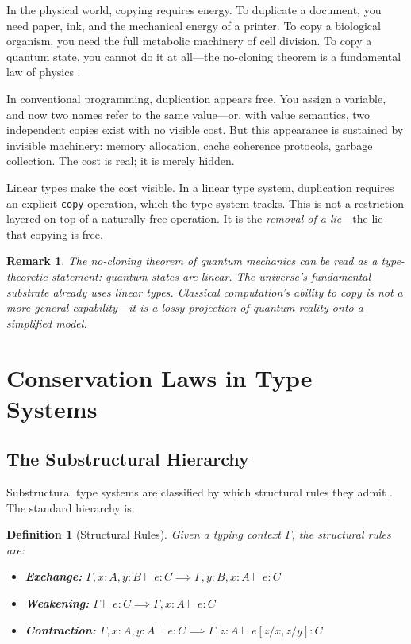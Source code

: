 \documentclass[11pt,a4paper]{article}
\newtheorem{definition}[theorem]{Definition}
\newtheorem{remark}[theorem]{Remark}
\begin{document}
In the physical world, copying requires energy. To duplicate a
document, you need paper, ink, and the mechanical energy of a
printer. To copy a biological organism, you need the full metabolic
machinery of cell division. To copy a quantum state, you cannot do
it at all---the no-cloning theorem is a fundamental law of physics
\citep{wootters1982nocloning}.

In conventional programming, duplication appears free. You assign a
variable, and now two names refer to the same value---or, with value
semantics, two independent copies exist with no visible cost. But
this appearance is sustained by invisible machinery: memory
allocation, cache coherence protocols, garbage collection. The cost
is real; it is merely hidden.

Linear types make the cost visible. In a linear type system,
duplication requires an explicit \texttt{copy} operation, which the
type system tracks. This is not a restriction layered on top of a
naturally free operation. It is the \emph{removal of a lie}---the lie
that copying is free.

\begin{remark}
The no-cloning theorem of quantum mechanics \citep{wootters1982nocloning}
can be read as a type-theoretic statement: quantum states are linear.
The universe's fundamental substrate already uses linear types. Classical
computation's ability to copy is not a more general capability---it is a
\emph{lossy projection} of quantum reality onto a simplified model.
\end{remark}


\section{Conservation Laws in Type Systems}
\label{sec:conservation}

\subsection{The Substructural Hierarchy}

Substructural type systems are classified by which structural rules
they admit \citep{walker2005substructural}. The standard hierarchy is:

\begin{definition}[Structural Rules]
Given a typing context $\Gamma$, the \emph{structural rules} are:
\begin{itemize}
\item \textbf{Exchange:} $\Gamma, x : A, y : B \vdash e : C
  \implies \Gamma, y : B, x : A \vdash e : C$
\item \textbf{Weakening:} $\Gamma \vdash e : C \implies
  \Gamma, x : A \vdash e : C$
\item \textbf{Contraction:} $\Gamma, x : A, y : A \vdash e : C
  \implies \Gamma, z : A \vdash e[z/x, z/y] : C$
\end{itemize}
\end{definition}
\end{document}
